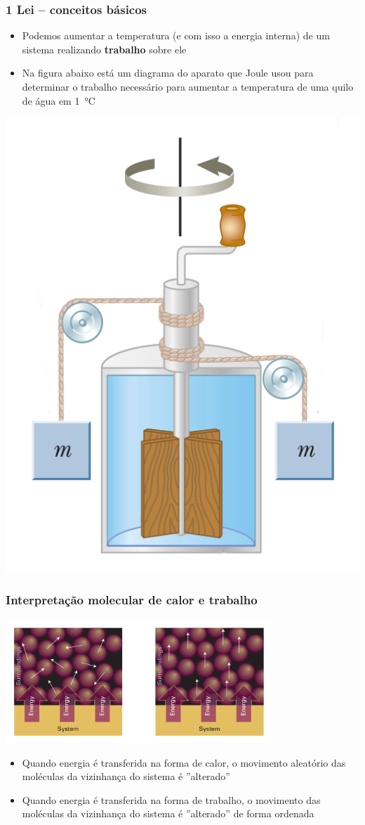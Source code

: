 \documentclass[t,%
brazilian,%
11pt,%
aspectratio=169,%
table%
]{beamer}
\begin{document}
\begin{frame}
    \frametitle{1\textordfeminine{} Lei -- conceitos básicos}
    \begin{itemize}
        \item Podemos aumentar a temperatura (e com isso a energia interna) de
            um sistema realizando \textbf{trabalho} sobre ele
        \item Na figura abaixo está um diagrama do aparato que Joule usou para
            determinar o trabalho necessário para aumentar a temperatura de uma
            quilo de água em \SI{1}{\celsius}
    \end{itemize}
    \begin{center}
        \includegraphics[width=0.3\textwidth-16pt*\real{0.78}]{images/joule.png}
    \end{center}
\end{frame}

\begin{frame}
    \frametitle{Interpretação molecular de calor e trabalho}
    \begin{center}
        \includegraphics[width=0.75\textwidth]{images/trabalho_calor.png}
    \end{center}

    \begin{itemize}

        \item Quando energia é transferida na forma de calor, o movimento
            aleatório das moléculas da vizinhança do sistema é ''alterado''
        \item Quando energia é transferida na forma de trabalho, o movimento
            das moléculas da vizinhança do sistema é ''alterado'' de forma
            ordenada

    \end{itemize}
\end{frame}
\end{document}
